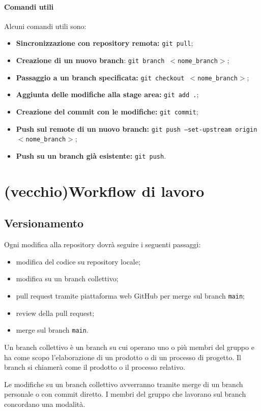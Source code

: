\documentclass[a4paper, 12pt]{article}
\begin{document}
\paragraph{Comandi utili}
Alcuni comandi utili sono:
\begin{itemize}
\item \textbf{Sincronizzazione con repository remota:} \texttt{git pull};
\item \textbf{Creazione di un nuovo branch}: \texttt{git branch $<$nome\_branch$>$};
\item \textbf{Passaggio a un branch specificata:} \texttt{git checkout $<$nome\_branch$>$};
\item \textbf{Aggiunta delle modifiche alla stage area:} \texttt{git add .};
\item \textbf{Creazione del commit con le modifiche:} \texttt{git commit};
\item \textbf{Push sul remote di un nuovo branch:} \texttt{git push --set-upstream origin $<$nome\_branch$>$};
\item \textbf{Push su un branch già esistente:} \texttt{git push}.
\end{itemize}

\section{(vecchio)Workflow di lavoro}
\subsection{Versionamento}

Ogni modifica alla repository dovrà seguire i seguenti passaggi:
\begin{itemize}
\item modifica del codice su repository locale;
\item modifica su un branch collettivo;
\item pull request tramite piattaforma web GitHub per merge sul branch \texttt{main};
\item review della pull request;
\item merge sul branch \texttt{main}.
\end{itemize}

Un branch collettivo è un branch su cui operano uno o più membri del gruppo e ha come scopo l'elaborazione di un prodotto o di un processo di progetto. Il branch si chiamerà come il prodotto o il processo relativo.

Le modifiche su un branch collettivo avverranno tramite merge di un branch personale o con commit diretto. I membri del gruppo che lavorano sul branch concordano una modalità.
\end{document}
